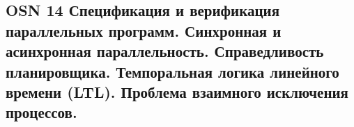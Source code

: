 \subsection{OSN 14 Спецификация и верификация параллельных программ. Синхронная и асинхронная параллельность. Справедливость планировщика.
Темпоральная логика линейного времени (LTL). Проблема взаимного исключения процессов.}
